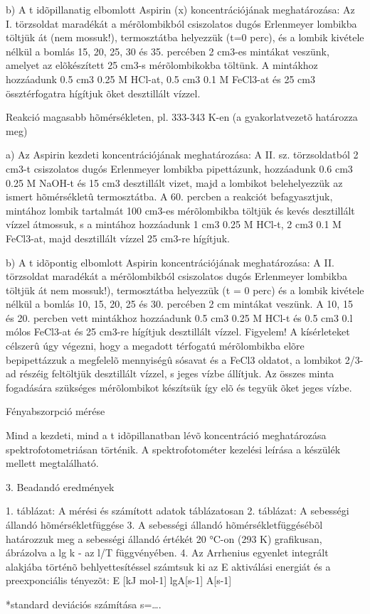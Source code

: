 \documentclass{article}
\begin{document}
b) A t idõpillanatig elbomlott Aspirin (x) koncentrációjának meghatározása:
Az I. törzsoldat maradékát a mérõlombikból csiszolatos dugós Erlenmeyer lombikba töltjük át (nem mossuk!), termosztátba helyezzük (t=0 perc), és a lombik kivétele nélkül a bomlás 15, 20, 25, 30 és 35. percében 2 cm3-es mintákat veszünk, amelyet az elõkészített 25 cm3-s mérõlombikokba töltünk.
A mintákhoz hozzáadunk 0.5 cm3 0.25 M HCl-at, 0.5 cm3 0.1 M FeCl3-at és 25 cm3 össztérfogatra hígítjuk õket desztillált vízzel.


Reakció magasabb hõmérsékleten, pl. 333-343 K-en (a gyakorlatvezetõ határozza meg)


a) Az Aspirin kezdeti koncentrációjának meghatározása:
A II. sz. törzsoldatból 2 cm3-t csiszolatos dugós Erlenmeyer lombikba pipettázunk, hozzáadunk 0.6 cm3 0.25 M NaOH-t és 15 cm3 desztillált vizet, majd a lombikot belehelyezzük az ismert hõmérsékletû termosztátba.
A 60. percben a reakciót befagyasztjuk, mintához lombik tartalmát 100 cm3-es mérõlombikba töltjük és kevés desztillált vízzel átmossuk, s a mintához hozzáadunk 1 cm3 0.25 M HCl-t, 2 cm3 0.1 M FeCl3-at, majd desztillált vízzel 25 cm3-re hígítjuk.

b) A t idõpontig elbomlott Aspirin koncentrációjának meghatározása:
A II. törzsoldat maradékát a mérõlombikból csiszolatos dugós Erlenmeyer lombikba töltjük át nem mossuk!), termosztátba helyezzük (t = 0 perc) és a lombik kivétele nélkül a bomlás 10, 15, 20, 25 és 30. percében 2 cm mintákat veszünk.
A 10, 15 és 20. percben vett mintákhoz hozzáadunk 0.5 cm3 0.25 M HCl-t és 0.5 cm3 0.l mólos FeCl3-at és 25 cm3-re hígítjuk desztillált vízzel.
Figyelem!
A kísérleteket célszerû úgy végezni, hogy a megadott térfogatú mérõlombikba elõre bepipettázzuk a megfelelõ mennyiségû sósavat és a FeCl3 oldatot, a lombikot 2/3-ad részéig feltöltjük desztillált vízzel, s jeges vízbe állítjuk. 
Az összes minta fogadására szükséges mérõlombikot készítsük így elõ és tegyük õket jeges vízbe.


Fényabszorpció mérése


Mind a kezdeti, mind a t idõpillanatban lévõ koncentráció meghatározása spektrofotometriásan történik.
A spektrofotométer kezelési leírása a készülék mellett megtalálható.


3. Beadandó eredmények

1. táblázat: A mérési és számított adatok táblázatosan
2. táblázat: A sebességi állandó hõmérsékletfüggése
3. A sebességi állandó hõmérsékletfüggésébõl határozzuk meg a sebességi állandó értékét 20 °C-on (293 K) grafikusan, ábrázolva a lg k - az l/T függvényében.
4. Az Arrhenius egyenlet integrált alakjába történõ behlyettesítéssel számtsuk ki az E aktiválási energiát és a preexponciális tényezõt:
E [kJ mol-1]
lgA[s-1]
A[s-1]

*standard deviációs számítása
s=….
\end{document}

